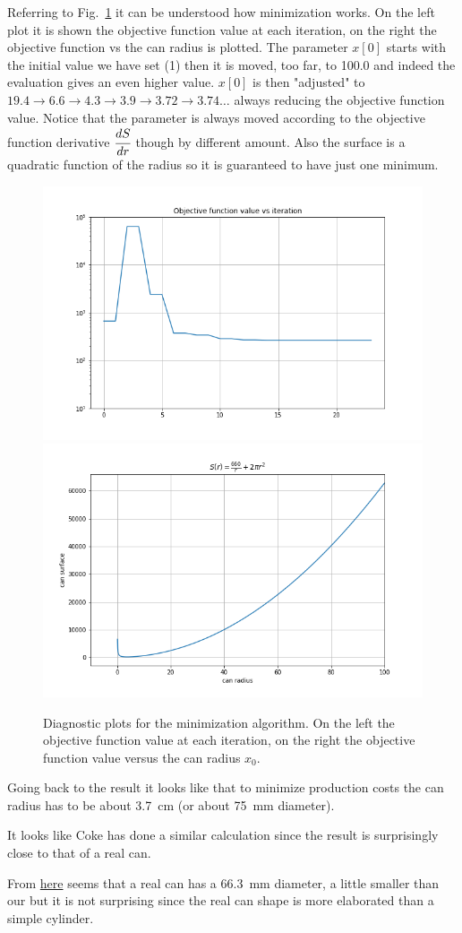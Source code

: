 Referring to Fig.~\ref{fig:minimization_diagnostic} it can be understood how minimization works. On the left plot it is shown the objective function value at each iteration, on the right the objective function vs the can radius is plotted.
The parameter $x[0]$ starts with the initial value we have set (1) then it is moved, too far, to 100.0 and indeed the evaluation gives an even higher value. $x[0]$ is then "adjusted" to $19.4\rightarrow 6.6\rightarrow 4.3\rightarrow 3.9\rightarrow 3.72\rightarrow 3.74\ldots$ always reducing the objective function value. Notice that the parameter is always moved according to the objective function derivative $\cfrac{dS}{dr}$ though by different amount.
Also the surface is a quadratic function of the radius so it is guaranteed to have just one minimum.

\begin{figure}[htb]
	\centering
	\includegraphics[width=0.45\linewidth]{figures/objective_function_value}
	\includegraphics[width=0.45\linewidth]{figures/can_surface}
	\caption{Diagnostic plots for the minimization algorithm. On the left the objective function value at each iteration, on the right the objective function value versus the can radius $x_0$.}
	\label{fig:minimization_diagnostic}
\end{figure}

Going back to the result it looks like that to minimize production costs the can radius has to be about 3.7~cm (or about 75~mm diameter).

\begin{curiosity}
It looks like Coke has done a similar calculation since the result is surprisingly close to that of a real can. 

From \href{	https://www.ball.com/eu/solutions/markets-capabilities/capabilities/beverage-cans/standard-range
}{here} seems that a real can has a 66.3~mm diameter, a little smaller than our but it is not surprising since the real can shape is more elaborated than a simple cylinder.
\end{curiosity}


